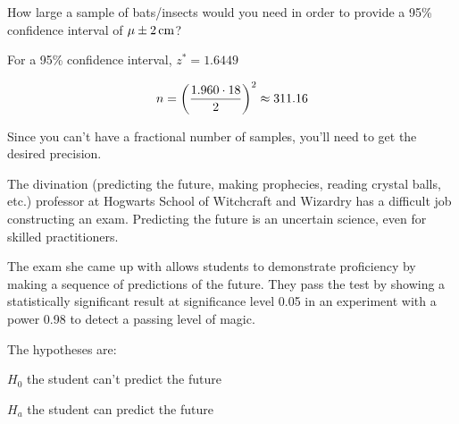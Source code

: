 \documentclass[landscape]{exam}
\begin{document}
\begin{questions}
\begin{parts}
\begin{solution}
          \end{solution}

      \end{parts}
          
    \question[5]\label{q:bats_last} How large a sample of bats/insects would you
    need in order to provide a 95\% confidence interval of 
    $\mu \pm \unit[2]{cm}$?

    \begin{solution}
      For a 95\% confidence interval, $z^* = 1.6449$

      \[
        n = \del{ \frac{1.960 \cdot 18}{ 2 } }^2 \approx 311.16  
      \]

      Since you can't have a fractional number of samples, you'll need 
       to get the desired precision.

    \end{solution}

    \question{} The divination (predicting the future, making prophecies,
    reading crystal balls, etc.) professor at Hogwarts School of Witchcraft
    and Wizardry has a difficult job constructing an exam. Predicting
    the future is an uncertain science, even for skilled practitioners.

    The exam she came up with allows students to demonstrate proficiency by
    making a sequence of predictions of the future. They pass the test by
    showing a statistically significant result at significance level 0.05 
    in an experiment with a power 0.98 to detect a passing level of magic.

    \begin{solution}
      The hypotheses are:
      \begin{itemize*}
        \item $H_0$ the student can't predict the future
        \item $H_a$ the student can predict the future
      \end{itemize*}
    \end{solution}

\end{questions}
\end{document}

